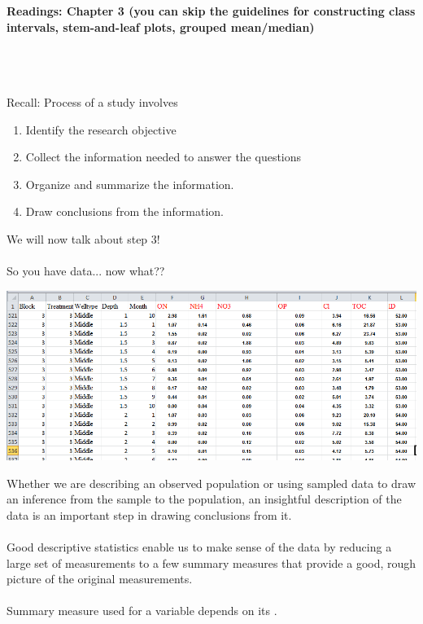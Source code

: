 \begin{center}\large\textbf{Readings: Chapter 3 (you can skip the guidelines for constructing class intervals, stem-and-leaf plots, grouped mean/median)}\\
\normalsize \end{center}
\large ~\hrulefill
~\\
\normalsize \\~\\
Recall:  Process of a study involves
\begin{enumerate}
\item Identify the research objective
\item Collect the information needed to answer the questions
\item Organize and summarize the information.
\item Draw conclusions from the information.
\end{enumerate}
We will now talk about step 3!\\~\\
So you have data... now what??\\
\begin{center}
\includegraphics[scale=0.7]{spreadsheet}
\end{center}

Whether we are describing an observed population or using sampled data to draw an inference from the sample to the population, an insightful description of the data is an important step in drawing conclusions from it.  \\~\\

Good descriptive statistics enable us to make sense of the data by reducing a large set of measurements to a few summary measures that provide a good, rough picture of the original measurements.\\~\\

Summary measure used for a variable depends on its \underbar{~~~~~~~~~~~~~~~~~~~~~~~~~~~~~~~~~~~~}.\\~\\


